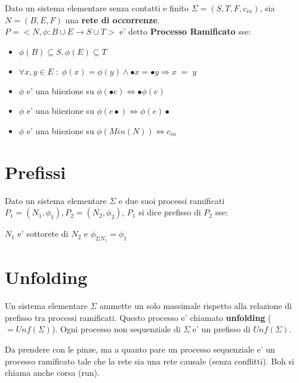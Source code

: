 Dato un sistema elementare senza contatti e finito $\Sigma = (S, T, F, c_{in})$, sia $N = (B, E, F)$ una \textbf{rete di occorrenze}. \\

$P = <N, \phi : B \cup E \rightarrow S \cup T>$ e' detto \textbf{Processo Ramificato} sse:

\begin{itemize}
    \item $\phi(B) \subseteq S, \phi(E) \subseteq T$
    \item $\forall x,y \in E \; : \; \phi(x) = \phi(y) \land \bullet x = \bullet y \Rightarrow x \; = \; y$
    \item $\phi$ e' una biiezione su $\phi(\bullet e) \Leftrightarrow \bullet \phi(e)$ 
    \item $\phi$ e' una biiezione su $\phi(e \bullet) \Leftrightarrow \phi(e) \bullet$ 
    \item $\phi$ e' una biiezione su $\phi(Min(N)) \Leftrightarrow c_{in}$ 
\end{itemize}


\section{Prefissi}

Dato un sistema elementare $\Sigma$ e due suoi processi ramificati $P_1 = (N_1, \phi_1), P_2 = (N_2, \phi_2)$, $P_1$ si dice prefisso di $P_2$ sse:

$N_1$ e' sottorete di $N_2$ e $\phi_{2|N_1} = \phi_1$

\section{Unfolding}

Un sistema elementare $\Sigma$ ammette un solo massimale rispetto alla relazione di prefisso tra processi ramificati. Questo processo e' chiamato \textbf{unfolding} ($= Unf(\Sigma)$).
Ogni processo non sequenziale di $\Sigma$ e' un prefisso di $Unf(\Sigma)$.

Da prendere con le pinze, ma a quanto pare un processo sequenziale e' un processo ramificato tale che la rete sia una rete causale (senza conflitti).
Boh si chiama anche corsa (run).
